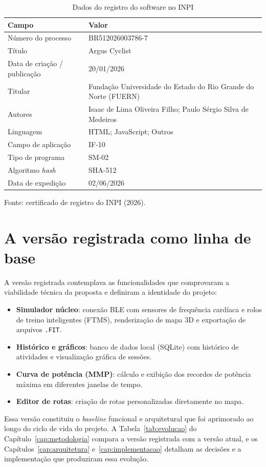 \begin{table}[H]
    \centering
    \caption{Dados do registro do software no INPI}
    \label{tab:registro}
    \small
    \begin{tabular}{>{\raggedright\arraybackslash}p{4.6cm}p{9.2cm}}
        \toprule
        \textbf{Campo} & \textbf{Valor} \\
        \midrule
        Número do processo & BR512026003786-7 \\
        Título & Argus Cyclist \\
        Data de criação / publicação & 20/01/2026 \\
        Titular & Fundação Universidade do Estado do Rio Grande do Norte (FUERN) \\
        Autores & Isaac de Lima Oliveira Filho; Paulo Sérgio Silva de Medeiros \\
        Linguagem & HTML; JavaScript; Outros \\
        Campo de aplicação & IF-10 \\
        Tipo de programa & SM-02 \\
        Algoritmo \textit{hash} & SHA-512 \\
        Data de expedição & 02/06/2026 \\
        \bottomrule
    \end{tabular}
    \vspace{0.2cm}
    \par\small Fonte: certificado de registro do INPI (2026).
\end{table}

\section{A versão registrada como linha de base}
\label{ap:registro-versao}

A versão registrada contemplava as funcionalidades que comprovaram a
viabilidade técnica da proposta e definiram a identidade do projeto:

\begin{itemize}
    \item \textbf{Simulador núcleo}: conexão BLE com sensores de frequência
        cardíaca e rolos de treino inteligentes (FTMS), renderização de mapa
        3D e exportação de arquivos \texttt{.FIT}.
    \item \textbf{Histórico e gráficos}: banco de dados local (SQLite) com
        histórico de atividades e visualização gráfica de sessões.
    \item \textbf{Curva de potência (MMP)}: cálculo e exibição dos recordes
        de potência máxima em diferentes janelas de tempo.
    \item \textbf{Editor de rotas}: criação de rotas personalizadas
        diretamente no mapa.
\end{itemize}

Essa versão constituiu o \textit{baseline} funcional e arquitetural que foi
aprimorado ao longo do ciclo de vida do projeto. A Tabela~\ref{tab:evolucao}
do Capítulo~\ref{cap:metodologia} compara a versão registrada com a versão
atual, e os Capítulos~\ref{cap:arquitetura} e~\ref{cap:implementacao}
detalham as decisões e a implementação que produziram essa evolução.
